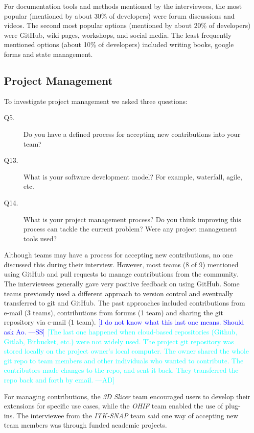 \documentclass[final, 3p, times, authoryear]{elsarticle}
\newcommand{\authornote}[3]{\textcolor{#1}{[#3 ---#2]}}
\newcommand{\authornote}[3]{}
\newcommand{\wss}[1]{\authornote{blue}{SS}{#1}} %
\newcommand{\ad}[1]{\authornote{cyan}{AD}{#1}} %
\begin{document}
For documentation tools and methods mentioned by the interviewees, the most
popular (mentioned by about 30\% of developers) were forum discussions and
videos.  The second most popular options (mentioned by about 20\% of developers)
were GitHub, wiki pages, workshops, and social media.  The least frequently
mentioned options (about 10\% of developers) included writing books, google
forms and state management.

\subsection{Project Management} \label{sec_contribution_pm}

To investigate project management we asked three questions:

\begin{description}
\item[Q5.] Do you have a defined process for accepting new contributions into
your team?
\item[Q13.] What is your software development model? For example, waterfall,
agile, etc.
\item[Q14.] What is your project management process? Do you
think improving this process can tackle the current problem? Were any project
management tools used?
\end{description}

Although teams may have a process for accepting new contributions, no one
discussed this during their interview. However, most teams (8 of 9) mentioned
using GitHub and pull requests to manage contributions from the community. The
interviewees generally gave very positive feedback on using GitHub. Some teams
previously used a different approach to version control and eventually
transferred to git and GitHub.  The past approaches included contributions
from e-mail (3 teams), contributions from forums (1 team) and sharing the
git repository via e-mail (1 team).  \wss{I do not know what this last one means.
Should ask Ao.} \ad{The last one happened when cloud-based repositories (Github,
Gitlab, Bitbucket, etc.) were not widely used. The project git repository was
stored locally on the project owner's local computer. The owner shared the whole
git repo to team members and other individuals who wanted to contribute. The
contributors made changes to the repo, and sent it back. They transferred the
repo back and forth by email.}

For managing contributions, the \textit{3D Slicer} team encouraged users to
develop their extensions for specific use cases, while the \textit{OHIF} team
enabled the use of plug-ins.  The interviewee from the \textit{ITK-SNAP} team
said one way of accepting new team members was through funded academic projects.
\end{document}
